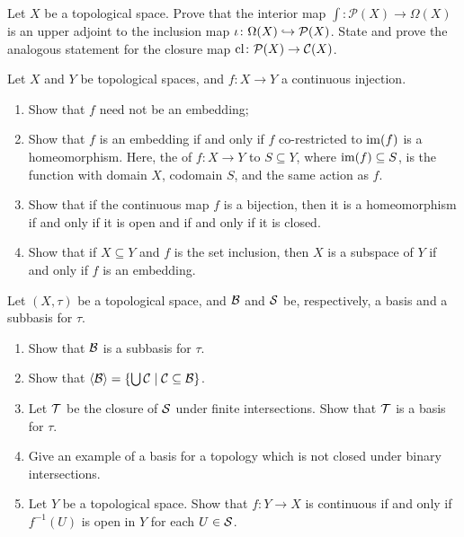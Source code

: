 \begin{exercise}\label{exer:int-adjoint}
Let $X$ be a topological space. Prove that the interior map $\int \colon \mathcal{P}(X) \to \Omega(X)$ is an upper adjoint to the inclusion map $\iota \colon \Omega(X) \hookrightarrow \mathcal{P}(X)$. State and prove the analogous statement for the closure map $\mathrm{cl} \colon \mathcal{P}(X) \to \mathcal{C}(X)$.
\end{exercise}

\begin{exercise}\label{exer:emb-homeo-subsp}
Let $X$ and $Y$ be topological spaces, and $f\colon X\to Y$ a continuous injection.
\begin{enumerate}
\item Show that $f$ need not be an embedding;
\item Show that $f$ is an embedding if and only if $f$ co-restricted to $\mathrm{im}(f)$ is a homeomorphism. Here, the  of $f\colon X\to Y$ to $S\subseteq Y$, where $\mathrm{im}(f)\subseteq S$, is the function with domain $X$, codomain $S$, and the same action as $f$.
\item Show that if the continuous map $f$ is a bijection, then it is a homeomorphism if and only if it is open and if and only if it is closed.
\item Show that if $X\subseteq Y$ and $f$ is the set inclusion, then $X$ is a subspace of $Y$ if and only if $f$ is an embedding.
\end{enumerate}
\end{exercise}

\begin{exercise}\label{exer:basis}
Let $(X,\tau)$ be a topological space, and $\mathcal{B}$ and $\mathcal{S}$ be, respectively, a basis and a subbasis for $\tau$.
\begin{enumerate}
\item  Show that $\mathcal{B}$ is a subbasis for $\tau$.
\item Show that ${\langle}\mathcal{B}{\rangle}=\{\bigcup\mathcal{C}\mid \mathcal{C}\subseteq\mathcal{B}\}$.
\item \label{itm:basis-from-subbasis} Let $\mathcal{T}$ be the closure of $\mathcal{S}$ under finite intersections. Show that $\mathcal{T}$ is a basis for $\tau$.
\item Give an example of a basis for a topology which is not closed under binary intersections.
\item Let $Y$ be a topological space. Show that $f\colon Y\to X$ is continuous if and only if $f^{-1}(U)$ is open in $Y$ for each $U\in\mathcal{S}$.
\end{enumerate}
\end{exercise}

